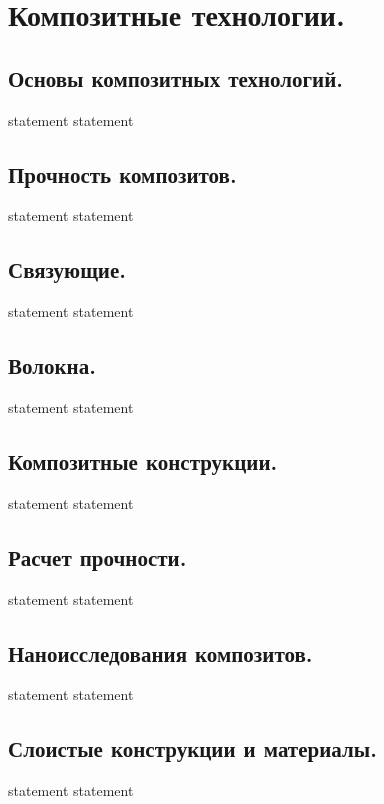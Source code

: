 \chapter{Композитные технологии.}

\section{Основы композитных технологий.}

{statement}
{statement}

\section{Прочность композитов.}

{statement}
{statement}

\section{Связующие.}

{statement}
{statement}

\section{Волокна.}

{statement}
{statement}

\section{Композитные конструкции.}

{statement}
{statement}

\section{Расчет прочности.}

{statement}
{statement}

\section{Наноисследования композитов.}

{statement}
{statement}

\section{Слоистые конструкции и материалы.}

{statement}
{statement}
